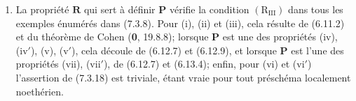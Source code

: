 \begin{remarks}[7.3.19]
\begin{enumerate}
\item[\textup{(i)}] La propriété $\boldsymbol R$ qui sert à définir $\boldsymbol P$
vérifie la condition $(\mathrm R_{\mathrm{III}})$ dans tous les exemples
énumérés dans (7.3.8). Pour (i), (ii) et (iii), cela résulte de (6.11.2)
et du théorème de Cohen (\textbf{0}, 19.8.8); lorsque $\boldsymbol P$ est une des
propriétés (iv), (iv$'$), (v), (v$'$), cela découle de (6.12.7) et
(6.12.9), et lorsque $\boldsymbol P$ est l'une des propriétés (vii),
(vii$'$), de (6.12.7) et (6.13.4); enfin, pour (vi) et (vi$'$)
l'assertion de (7.3.18) est triviale, étant vraie pour tout préschéma
localement noethérien.



\end{enumerate}
\end{remarks}
